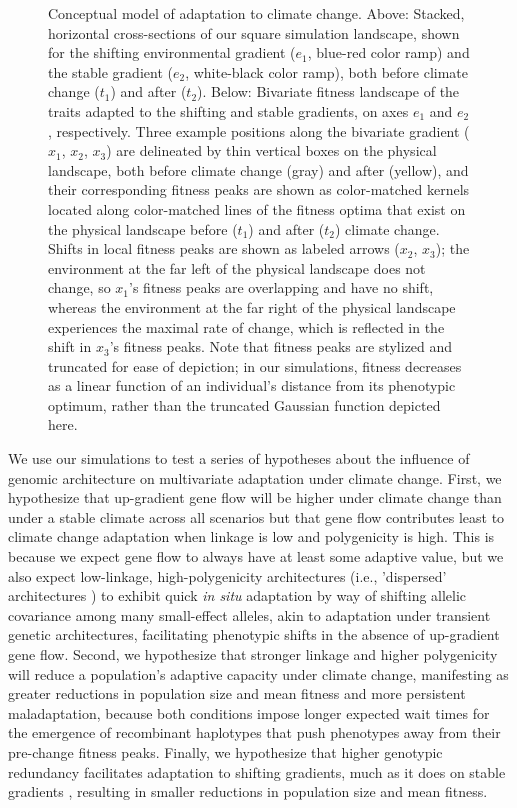 \documentclass[9pt,twocolumn,twoside,lineno]{pnas-new}
\begin{document}
\begin{figure}
    \caption{Conceptual model of adaptation to climate change. Above: Stacked, horizontal cross-sections of our square simulation landscape, shown for the shifting environmental gradient ($e_{1}$, blue-red color ramp) and the stable gradient ($e_{2}$, white-black color ramp), both before climate change ($t_{1}$) and after ($t_{2}$). Below: Bivariate fitness landscape of the traits adapted to the shifting and stable gradients, on axes $e_{1}$ and $e_{2}$, respectively. Three example positions along the bivariate gradient ($x_{1}$, $x_{2}$, $x_{3}$) are delineated by thin vertical boxes on the physical landscape, both before climate change (gray) and after (yellow), and their corresponding fitness peaks are shown as color-matched kernels located along color-matched lines of the fitness optima that exist on the physical landscape before ($t_{1}$) and after ($t_{2}$) climate change. Shifts in local fitness peaks are shown as labeled arrows ($x_{2}$, $x_{3}$); the environment at the far left of the physical landscape does not change, so $x_{1}$'s fitness peaks are overlapping and have no shift, whereas the environment at the far right of the physical landscape experiences the maximal rate of change, which is reflected in the shift in $x_{3}$'s fitness peaks. Note that fitness peaks are stylized and truncated for ease of depiction; in our simulations, fitness decreases as a linear function of an individual's distance from its phenotypic optimum, rather than the truncated Gaussian function depicted here.}
\label{fig:fig_1}
\end{figure}


We use our simulations to test a series of hypotheses about the influence of genomic architecture 
on multivariate adaptation under climate change. First, we hypothesize that up-gradient 
gene flow will be higher under climate change than under a stable climate across all
scenarios but that gene flow contributes least to climate change adaptation when
linkage is low and polygenicity is high.
This is because we expect gene flow to always have
at least some adaptive value, but we also expect low-linkage, high-polygenicity architectures 
(i.e., 'dispersed' architectures \cite{yeaman_review}) to exhibit quick \textit{in situ}
adaptation by way of shifting allelic covariance among many small-effect alleles, akin to adaptation 
under transient genetic architectures, facilitating phenotypic shifts in the absence of up-gradient gene flow.
Second, we hypothesize that stronger linkage 
and higher polygenicity will reduce a population's adaptive capacity under climate change,
manifesting as greater reductions in population size and mean fitness
and more persistent maladaptation, because both conditions impose longer expected
wait times for the emergence of recombinant haplotypes that push phenotypes
away from their pre-change fitness peaks. Finally, we hypothesize that higher genotypic redundancy
facilitates adaptation to shifting gradients, much as it does on stable gradients 
\cite{barghi_redundancy,manceau,yeaman_amnat}, resulting in smaller reductions 
in population size and mean fitness.
\end{document}
